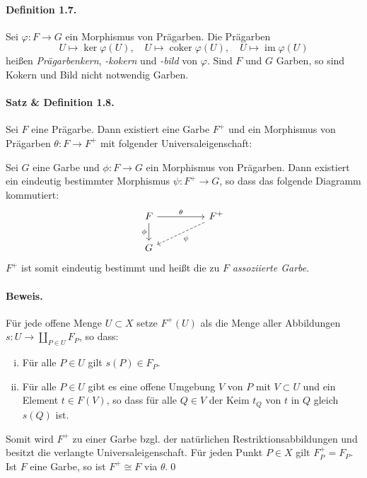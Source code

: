 \paragraph{Definition 1.7.}\label{1.7} Sei $\varphi:F\to G$ ein Morphismus von Prägarben. Die Prägarben
\[U\mapsto \ker\varphi(U),\quad U\mapsto\operatorname{coker}\varphi(U),\quad U\mapsto\operatorname{im}\varphi(U) \]
heißen \textit{Prägarbenkern}, \textit{-kokern} und \textit{-bild} von $\varphi$. Sind $F$ und $G$ Garben, so sind Kokern und Bild nicht notwendig Garben.

\paragraph{Satz \& Definition 1.8.}\label{1.8} Sei $F$ eine Prägarbe. Dann existiert eine Garbe $F^+$ und ein Morphismus von Prägarben $\theta:F\to F^+$ mit folgender Universaleigenschaft:

Sei $G$ eine Garbe und $\phi:F\to G$ ein Morphismus von Prägarben. Dann existiert ein eindeutig bestimmter Morphismus $\psi:F^+\to G$, so dass das folgende Diagramm kommutiert:
\[\begin{tikzcd}
F\ar[rr, "\theta"]\ar[d, "\phi"'] && F^+\ar[dll, "\psi", dashed]\\
G
\end{tikzcd} \]
$F^+$ ist somit eindeutig bestimmt und heißt die zu $F$ \textit{assoziierte Garbe}.

\paragraph{Beweis.} Für jede offene Menge $U\subset X$ setze $F^+(U)$ als die Menge aller Abbildungen $s:U\to\coprod_{P\in U}F_P$, so dass:
\begin{enumerate}[(i)]
\item Für alle $P\in U$ gilt $s(P)\in F_P$.
\item Für alle $P\in U$ gibt es eine offene Umgebung $V$ von $P$ mit $V\subset U$ und ein Element $t\in F(V)$, so dass für alle $Q\in V$ der Keim $t_Q$ von $t$ in $Q$ gleich $s(Q)$ ist.
\end{enumerate}
Somit wird $F^+$ zu einer Garbe bzgl. der natürlichen Restriktionsabbildungen und besitzt die verlangte Universaleigenschaft. Für jeden Punkt $P\in X$ gilt $F^+_P=F_P$. Ist $F$ eine Garbe, so ist $F^+\cong F$ via $\theta$.\qed

